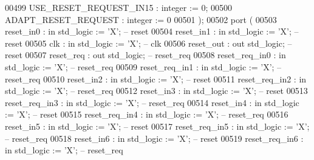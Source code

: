 \begin{DoxyCode}
00499             USE\_RESET\_REQUEST\_IN15    : \textcolor{comment}{integer} := \textcolor{vhdllogic}{}\textcolor{vhdllogic}{0};
00500             ADAPT\_RESET\_REQUEST       : \textcolor{comment}{integer} := \textcolor{vhdllogic}{}\textcolor{vhdllogic}{0}
00501         );
00502         \textcolor{keywordflow}{port} (
00503             reset\_in0      : \textcolor{keywordflow}{in}  \textcolor{comment}{std\_logic} := 'X'; \textcolor{keyword}{-- reset}
00504             reset\_in1      : \textcolor{keywordflow}{in}  \textcolor{comment}{std\_logic} := 'X'; \textcolor{keyword}{-- reset}
00505             clk            : \textcolor{keywordflow}{in}  \textcolor{comment}{std\_logic} := 'X'; \textcolor{keyword}{-- clk}
00506             reset\_out      : \textcolor{keywordflow}{out} \textcolor{comment}{std\_logic};        \textcolor{keyword}{-- reset}
00507             reset\_req      : \textcolor{keywordflow}{out} \textcolor{comment}{std\_logic};        \textcolor{keyword}{-- reset\_req}
00508             reset\_req\_in0  : \textcolor{keywordflow}{in}  \textcolor{comment}{std\_logic} := 'X'; \textcolor{keyword}{-- reset\_req}
00509             reset\_req\_in1  : \textcolor{keywordflow}{in}  \textcolor{comment}{std\_logic} := 'X'; \textcolor{keyword}{-- reset\_req}
00510             reset\_in2      : \textcolor{keywordflow}{in}  \textcolor{comment}{std\_logic} := 'X'; \textcolor{keyword}{-- reset}
00511             reset\_req\_in2  : \textcolor{keywordflow}{in}  \textcolor{comment}{std\_logic} := 'X'; \textcolor{keyword}{-- reset\_req}
00512             reset\_in3      : \textcolor{keywordflow}{in}  \textcolor{comment}{std\_logic} := 'X'; \textcolor{keyword}{-- reset}
00513             reset\_req\_in3  : \textcolor{keywordflow}{in}  \textcolor{comment}{std\_logic} := 'X'; \textcolor{keyword}{-- reset\_req}
00514             reset\_in4      : \textcolor{keywordflow}{in}  \textcolor{comment}{std\_logic} := 'X'; \textcolor{keyword}{-- reset}
00515             reset\_req\_in4  : \textcolor{keywordflow}{in}  \textcolor{comment}{std\_logic} := 'X'; \textcolor{keyword}{-- reset\_req}
00516             reset\_in5      : \textcolor{keywordflow}{in}  \textcolor{comment}{std\_logic} := 'X'; \textcolor{keyword}{-- reset}
00517             reset\_req\_in5  : \textcolor{keywordflow}{in}  \textcolor{comment}{std\_logic} := 'X'; \textcolor{keyword}{-- reset\_req}
00518             reset\_in6      : \textcolor{keywordflow}{in}  \textcolor{comment}{std\_logic} := 'X'; \textcolor{keyword}{-- reset}
00519             reset\_req\_in6  : \textcolor{keywordflow}{in}  \textcolor{comment}{std\_logic} := 'X'; \textcolor{keyword}{-- reset\_req}

\end{DoxyCode}
